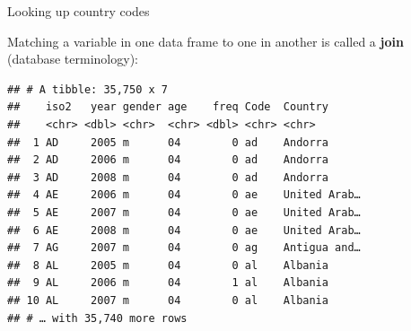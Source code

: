 \documentclass[ignorenonframetext,]{beamer}
\newenvironment{Shaded}{\begin{snugshade}}{\end{snugshade}}
\newcommand{\DataTypeTok}[1]{\textcolor[rgb]{0.13,0.29,0.53}{#1}}
\newcommand{\KeywordTok}[1]{\textcolor[rgb]{0.13,0.29,0.53}{\textbf{#1}}}
\newcommand{\NormalTok}[1]{#1}
\newcommand{\OperatorTok}[1]{\textcolor[rgb]{0.81,0.36,0.00}{\textbf{#1}}}
\newcommand{\StringTok}[1]{\textcolor[rgb]{0.31,0.60,0.02}{#1}}
\begin{document}
\begin{frame}[fragile]{Looking up country codes}
\protect\hypertarget{looking-up-country-codes}{}

Matching a variable in one data frame to one in another is called a
\textbf{join} (database terminology):

\begin{Shaded}
\end{Shaded}

\begin{verbatim}
## # A tibble: 35,750 x 7
##    iso2   year gender age    freq Code  Country     
##    <chr> <dbl> <chr>  <chr> <dbl> <chr> <chr>       
##  1 AD     2005 m      04        0 ad    Andorra     
##  2 AD     2006 m      04        0 ad    Andorra     
##  3 AD     2008 m      04        0 ad    Andorra     
##  4 AE     2006 m      04        0 ae    United Arab…
##  5 AE     2007 m      04        0 ae    United Arab…
##  6 AE     2008 m      04        0 ae    United Arab…
##  7 AG     2007 m      04        0 ag    Antigua and…
##  8 AL     2005 m      04        0 al    Albania     
##  9 AL     2006 m      04        1 al    Albania     
## 10 AL     2007 m      04        0 al    Albania     
## # … with 35,740 more rows
\end{verbatim}

\end{frame}
\end{document}
